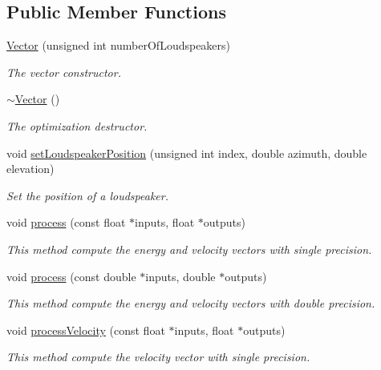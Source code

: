\subsection*{Public Member Functions}
\begin{DoxyCompactItemize}
\item 
\hyperlink{class_hoa3_d_1_1_vector_a0a3ee9bd9477f9d20e123691c2e80315}{Vector} (unsigned int number\-Of\-Loudspeakers)
\begin{DoxyCompactList}\small\item\em The vector constructor. \end{DoxyCompactList}\item 
\hyperlink{class_hoa3_d_1_1_vector_a0f7403e0ae42fe40f54fcb35977bf95c}{$\sim$\-Vector} ()
\begin{DoxyCompactList}\small\item\em The optimization destructor. \end{DoxyCompactList}\item 
void \hyperlink{class_hoa3_d_1_1_vector_afab0f404886f74f5a139210d1a497936}{set\-Loudspeaker\-Position} (unsigned int index, double azimuth, double elevation)
\begin{DoxyCompactList}\small\item\em Set the position of a loudspeaker. \end{DoxyCompactList}\item 
void \hyperlink{class_hoa3_d_1_1_vector_a7818f4b944e66d27f08de1965c18e2bd}{process} (const float $\ast$inputs, float $\ast$outputs)
\begin{DoxyCompactList}\small\item\em This method compute the energy and velocity vectors with single precision. \end{DoxyCompactList}\item 
void \hyperlink{class_hoa3_d_1_1_vector_abf7d541dea71e683dda0aa494d843a64}{process} (const double $\ast$inputs, double $\ast$outputs)
\begin{DoxyCompactList}\small\item\em This method compute the energy and velocity vectors with double precision. \end{DoxyCompactList}\item 
void \hyperlink{class_hoa3_d_1_1_vector_a9c875cc6ac2171c5d8e1b8c1d466a844}{process\-Velocity} (const float $\ast$inputs, float $\ast$outputs)
\begin{DoxyCompactList}\small\item\em This method compute the velocity vector with single precision. \end{DoxyCompactList}\item 

\end{DoxyCompactItemize}
